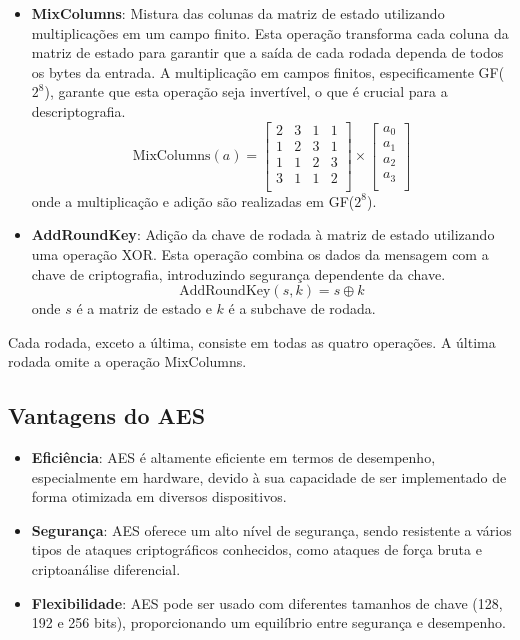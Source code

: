 \documentclass[a4paper,12pt]{article}
\begin{document}
\begin{itemize}
    \item \textbf{MixColumns}: Mistura das colunas da matriz de estado utilizando multiplicações em um campo finito. Esta operação transforma cada coluna da matriz de estado para garantir que a saída de cada rodada dependa de todos os bytes da entrada. A multiplicação em campos finitos, especificamente GF($2^8$), garante que esta operação seja invertível, o que é crucial para a descriptografia.
    \[
    \text{MixColumns}(a) = \begin{bmatrix}
    2 & 3 & 1 & 1 \\
    1 & 2 & 3 & 1 \\
    1 & 1 & 2 & 3 \\
    3 & 1 & 1 & 2 \\
    \end{bmatrix} \times \begin{bmatrix}
    a_{0} \\
    a_{1} \\
    a_{2} \\
    a_{3} \\
    \end{bmatrix}
    \]
    onde a multiplicação e adição são realizadas em GF($2^8$).

    \item \textbf{AddRoundKey}: Adição da chave de rodada à matriz de estado utilizando uma operação XOR. Esta operação combina os dados da mensagem com a chave de criptografia, introduzindo segurança dependente da chave.
    \[
    \text{AddRoundKey}(s, k) = s \oplus k
    \]
    onde $s$ é a matriz de estado e $k$ é a subchave de rodada.
\end{itemize}

Cada rodada, exceto a última, consiste em todas as quatro operações. A última rodada omite a operação MixColumns.

\subsection*{Vantagens do AES}

\begin{itemize}
    \item \textbf{Eficiência}: AES é altamente eficiente em termos de desempenho, especialmente em hardware, devido à sua capacidade de ser implementado de forma otimizada em diversos dispositivos.
    \item \textbf{Segurança}: AES oferece um alto nível de segurança, sendo resistente a vários tipos de ataques criptográficos conhecidos, como ataques de força bruta e criptoanálise diferencial.
    \item \textbf{Flexibilidade}: AES pode ser usado com diferentes tamanhos de chave (128, 192 e 256 bits), proporcionando um equilíbrio entre segurança e desempenho.
\end{itemize}
\end{document}
